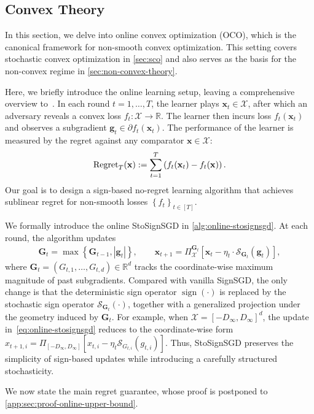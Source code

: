 \documentclass{article}
\def \x {\mathbf{x}}
\def \g {\mathbf{g}}
\def \R {\mathbb{R}}
\def \SS {\mathcal{S}}
\def \Gb {\mathbf{G}}
\def \X {\mathcal{X}}
\DeclareMathOperator*{\sgn}{sign}
\newcommand{\abs}[1]{\left|#1\right|}
\newcommand{\sign}[1]{\sgn\left(#1\right)}
\newcommand{\sqbrac}[1]{\left[#1\right]}
\newcommand{\brac}[1]{\left(#1\right)}
\newcommand{\cbrac}[1]{\left\{#1\right\}}
\begin{document}
\subsection{Convex Theory\label{sec:convex-theory}}

In this section, we delve into online convex optimization (OCO), which is the canonical framework for non-smooth convex optimization. This setting covers stochastic convex optimization in \cref{sec:sco} and also serves as the basis for the non-convex regime in \cref{sec:non-convex-theory}.

Here, we briefly introduce the online learning setup, leaving a comprehensive overview to~\citep{cesa2006prediction,orabona2019intro,hazan2019introduction}. In each round $t=1,\dots,T$, the learner plays $\x_t\in\X$, after which an adversary reveals a convex loss $f_t:\X\to\R$. The learner then incurs loss $f_t(\x_t)$ and observes a subgradient $\g_t\in\partial f_t(\x_t)$. The performance of the learner is measured by the regret against any comparator $\x\in\X$: 
\begin{align*}
\textnormal{Regret}_T(\x):=\sum_{t=1}^T\brac{f_t(\x_t)-f_t(\x)}.
\end{align*}
\noindent Our goal is to design a sign-based no-regret learning algorithm that achieves sublinear regret for non-smooth losses $\cbrac{f_t}_{t\in[T]}$.

We formally introduce the online StoSignSGD in \cref{alg:online-stosignsgd}. At each round, the algorithm updates
\begin{align}\label{eq:online-stosignsgd}
    \Gb_t=\max\cbrac{\Gb_{t-1},\abs{\g_t}},\qquad
\x_{t+1}=\Pi_\X^{\Gb_t}\sqbrac{\x_t-\eta_t\cdot \SS_{\Gb_t}(\g_t)},
\end{align}
where $\Gb_t=(G_{t,1},\dots,G_{t,d})\in\R^d$ tracks the coordinate-wise maximum magnitude of past subgradients. Compared with vanilla SignSGD, the only change is that the deterministic sign operator $\sign{\cdot}$ is replaced by the stochastic sign operator $\SS_{\Gb_t}(\cdot)$, together with a generalized projection under the geometry induced by $\Gb_t$. For example, when $\X=[-D_\infty,D_\infty]^d$, the update in~\eqref{eq:online-stosignsgd} reduces to the coordinate-wise form $x_{t+1,i}=\Pi_{[-D_\infty,D_\infty]}\sqbrac{x_{t,i}-\eta_t\SS_{G_{t,i}}(g_{t,i})}$. Thus, StoSignSGD preserves the simplicity of sign-based updates while introducing a carefully structured stochasticity.

We now state the main regret guarantee, whose proof is postponed to \cref{app:sec:proof-online-upper-bound}.
\end{document}
